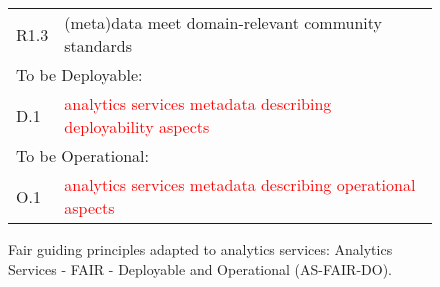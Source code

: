 \begin{figure}[htb]
{\begin{tabular}{p{1cm}p{8cm}}
R1.3 & (meta)data meet domain-relevant community standards \\
\multicolumn{2}{l}{To be Deployable:}\\
D.1 & \textcolor{red}{analytics services metadata describing deployability aspects} \\
\multicolumn{2}{l}{To be Operational:} \\ 
O.1 & \textcolor{red}{analytics services metadata describing operational aspects} \\ 
\end{tabular}
}
\caption{Fair guiding principles adapted to analytics services:
  Analytics Services - FAIR - Deployable and Operational
  (AS-FAIR-DO).}\label{fig:as-fair-do}
\end{figure}

